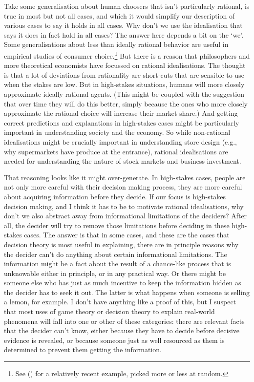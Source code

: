 \documentclass[
  12pt,
  letterpaper,
  DIV=11,
  numbers=noendperiod]{scrreprt}
\begin{document}
Take some generalisation about human choosers that isn't particularly
rational, is true in most but not all cases, and which it would simplify
our description of various cases to say it holds in all cases. Why don't
we use the idealisation that says it does in fact hold in all cases? The
answer here depends a bit on the `we'. Some generalisations about less
than ideally rational behavior are useful in empirical studies of
consumer choice.\footnote{See
  () for a relatively
  recent example, picked more or less at random.} But there is a reason
that philosophers and more theoretical economists have focussed on
rational idealisations. The thought is that a lot of deviations from
rationality are short-cuts that are sensible to use when the stakes are
low. But in high-stakes situations, humans will more closely approximate
ideally rational agents. (This might be coupled with the suggestion that
over time they will do this better, simply because the ones who more
closely approximate the rational choice will increase their market
share.) And getting correct predictions and explanations in high-stakes
cases might be particularly important in understanding society and the
economy. So while non-rational idealisations might be crucially
important in understanding store design (e.g., why supermarkets have
produce at the entrance), rational idealisations are needed for
understanding the nature of stock markets and business investment.

That reasoning looks like it might over-generate. In high-stakes cases,
people are not only more careful with their decision making process,
they are more careful about acquiring information before they decide. If
our focus is high-stakes decision making, and I think it has to be to
motivate rational idealisations, why don't we also abstract away from
informational limitations of the deciders? After all, the decider will
try to remove those limitations before deciding in these high-stakes
cases. The answer is that in some cases, and these are the cases that
decision theory is most useful in explaining, there are in principle
reasons why the decider can't do anything about certain informational
limitations. The information might be a fact about the result of a
chance-like process that is unknowable either in principle, or in any
practical way. Or there might be someone else who has just as much
incentive to keep the information hidden as the decider has to seek it
out. The latter is what happens when someone is selling a lemon, for
example. I don't have anything like a proof of this, but I suspect that
most uses of game theory or decision theory to explain real-world
phenomena will fall into one or other of these categories: there are
relevant facts that the decider can't know, either because they have to
decide before decisive evidence is revealed, or because someone just as
well resourced as them is determined to prevent them getting the
information.
\end{document}
